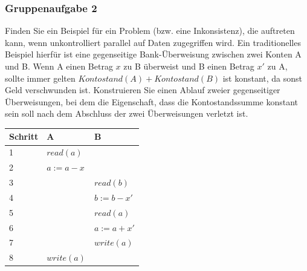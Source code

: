 \begin{frame}
	\frametitle{Gruppenaufgabe 2}
	\vspace{0.5cm}

	Finden Sie ein Beispiel für ein Problem (bzw. eine Inkonsistenz),
	die auftreten kann, wenn unkontrolliert parallel auf Daten zugegriffen wird.
	Ein traditionelles Beispiel hierfür ist eine gegenseitige Bank-Überweisung zwischen zwei
	Konten A und B. Wenn A einen Betrag \( x \) zu B überweist und B einen Betrag \( x' \)
	zu A, sollte immer gelten \( Kontostand(A) + Kontostand(B) \) ist konstant,
	da sonst Geld verschwunden ist.
	Konstruieren Sie einen Ablauf zweier gegenseitiger Überweisungen,
	bei dem die Eigenschaft, dass die Kontostandssumme konstant sein soll nach dem
	Abschluss der zwei Überweisungen verletzt ist.

	\pause
	\begin{table}[]
		\begin{tabular}{l|l|l}
			Schritt & A                & B                 \\ \hline
			1       & \( read(a) \)    &                   \\
			2       & \( a := a - x \) &                   \\
			3       &                  & \( read(b) \)     \\
			4       &                  & \( b := b - x' \) \\
			5       &                  & \( read(a) \)     \\
			6       &                  & \( a := a + x' \) \\
			7       &                  & \( write(a) \)    \\
			8       & \( write(a) \)   &                   \\
		\end{tabular}
	\end{table}
\end{frame}
